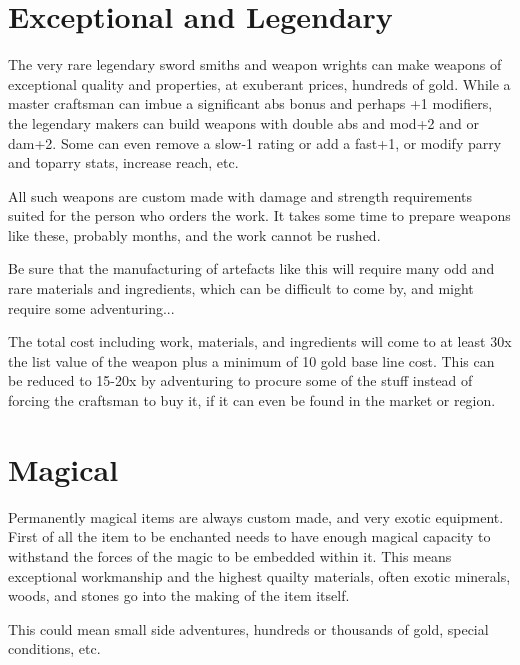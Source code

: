 

\goodbreak
{}
\section*{Exceptional and Legendary}
The very rare legendary sword smiths and weapon wrights can make weapons of exceptional quality and properties, at exuberant prices, hundreds of gold. While a master craftsman can imbue a significant abs bonus and perhaps +1 modifiers, the legendary makers can build weapons with double abs and mod+2 and or dam+2. Some can even remove a slow-1 rating or add a fast+1, or modify parry and toparry stats, increase reach, etc.

All such weapons are custom made with damage and strength requirements suited for the person who orders the work. It takes some time to prepare weapons like these, probably months, and the work cannot be rushed.

Be sure that the manufacturing of artefacts like this will require many odd and rare materials and ingredients, which can be difficult to come by, and might require some adventuring...

The total cost including work, materials, and ingredients will come to at least 30x the list value of the weapon plus a minimum of 10 gold base line cost. This can be reduced to 15-20x by adventuring to procure some of the stuff instead of forcing the craftsman to buy it, if it can even be found in the market or region.


\section*{Magical}
Permanently magical items are always custom made, and very exotic equipment.
First of all the item to be enchanted needs to have enough magical capacity to withstand the forces of the magic to be embedded within it. This means exceptional workmanship and the highest quailty materials, often exotic minerals, woods, and stones go into the making of the item itself.

This could mean small side adventures, hundreds or thousands of gold, special conditions, etc.


